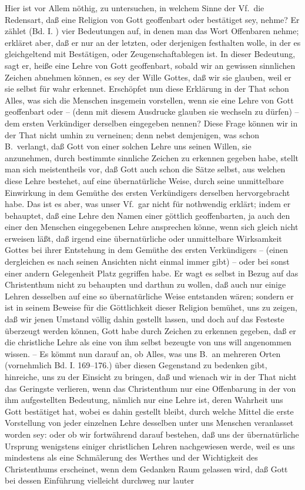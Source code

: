 Hier ist vor Allem nöthig, zu untersuchen, in welchem Sinne der Vf.\ die Redensart, daß eine Religion von Gott geoffenbart oder bestätiget sey, nehme? Er zählet (Bd. I. ) vier Bedeutungen auf, in denen man das Wort Offenbaren nehme; erkläret aber, daß er nur an der letzten, oder derjenigen festhalten wolle, in der es gleichgeltend mit Bestätigen, oder Zeugenschaftablegen ist. In dieser Bedeutung, sagt er, heiße eine Lehre von Gott geoffenbart, sobald wir an gewissen sinnlichen Zeichen abnehmen können, es sey der Wille Gottes, daß wir sie glauben, weil er sie selbst für wahr erkennet. Erschöpfet nun diese Erklärung in der That schon Alles, was sich die Menschen insgemein vorstellen, wenn sie eine Lehre von Gott geoffenbart oder -- (denn mit diesem Ausdrucke glauben sie wechseln zu dürfen) -- dem ersten Verkündiger derselben eingegeben nennen? Diese Frage können wir in der That nicht umhin zu verneinen; denn nebst demjenigen, was schon B.\ verlangt, daß Gott von einer solchen Lehre uns seinen Willen, sie  anzunehmen, durch bestimmte sinnliche Zeichen zu erkennen gegeben habe, stellt man sich meistentheils vor, daß Gott auch schon die Sätze selbst, aus welchen diese Lehre bestehet, auf eine übernatürliche Weise, durch seine unmittelbare Einwirkung in dem Gemüthe des ersten Verkündigers derselben hervorgebracht habe. Das ist es aber, was unser Vf.\ gar nicht für nothwendig erklärt; indem er behauptet, daß eine Lehre den Namen einer göttlich geoffenbarten, ja auch den einer den Menschen eingegebenen Lehre ansprechen könne, wenn sich gleich nicht erweisen läßt, daß irgend eine übernatürliche oder unmittelbare Wirksamkeit Gottes bei ihrer Entstehung in dem Gemüthe des ersten Verkündigers -- (einen dergleichen es nach seinen Ansichten nicht einmal immer gibt) -- oder bei sonst einer andern Gelegenheit Platz gegriffen habe. Er wagt es selbst in Bezug auf das Christenthum nicht zu behaupten und darthun zu wollen, daß auch nur einige Lehren desselben auf eine so übernatürliche Weise entstanden wären; sondern er ist  in seinem Beweise für die Göttlichkeit dieser Religion bemühet, uns zu zeigen, daß wir jenen Umstand völlig dahin gestellt lassen, und doch auf das Festeste überzeugt werden können, Gott habe durch Zeichen zu erkennen gegeben, daß er die christliche Lehre als eine von ihm selbst bezeugte von uns will angenommen wissen. -- Es kömmt nun darauf an, ob Alles, was uns B.\ an mehreren Orten (vornehmlich Bd. I.  169--176.) über diesen Gegenstand zu bedenken gibt, hinreiche, uns zu der Einsicht zu bringen, daß und wienach wir in der That nicht das Geringste verlieren, wenn das Christenthum nur eine Offenbarung in der von ihm aufgestellten Bedeutung, nämlich nur eine Lehre ist, deren Wahrheit uns Gott bestätiget hat, wobei es dahin gestellt bleibt, durch welche Mittel die erste Vorstellung von jeder einzelnen Lehre desselben unter uns Menschen veranlasset worden sey: oder ob wir fortwährend darauf bestehen, daß uns der übernatürliche Ursprung wenigstens einiger christlichen Lehren nachgewiesen werde, weil es uns mindestens als eine Schmälerung des Werthes und der Wichtigkeit des Christenthums erscheinet, wenn dem Gedanken Raum gelassen wird, daß Gott bei dessen Einführung vielleicht durchweg nur lauter 